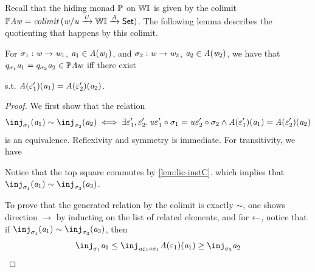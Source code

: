 Recall that the hiding monad ${\mathbb{P}}$ on $\mathbb{W}\mathbb{I}$ is given by the colimit ${\mathbb{P}}\mathit{A}\mathit{w} = \mathit{colimit}\,{({\mathit{w}}/{\mathit{u}} \xrightarrow{\mathit{U}} \mathbb{W}\mathbb{I} \xrightarrow{\mathit{A}} \mathsf{Set})}$.
The following lemma describes the quotienting that happens by this colimit.
\begin{lemma}\label{lem:hmon-quotient}
    For $\sigma_1 : \mathit{w} \to \mathit{w}_1$, $\mathit{a}_1 \in \mathit{A}(\mathit{w}_1)$, and $\sigma_2 : \mathit{w} \to \mathit{w}_2$, $\mathit{a}_2 \in \mathit{A}(\mathit{w}_2)$, 
    we have that $q_{\sigma_1}\mathit{a}_1 = q_{\sigma_2}\mathit{a}_2 \in {\mathbb{P}}\mathit{A}\mathit{w}$ iff there exist 
    s.t. $\mathit{A}(\varepsilon_1')(\mathit{a}_1) = \mathit{A}(\varepsilon_2')(\mathit{a}_2)$.
\end{lemma}
\begin{proof}
    We first show that the relation
    \[ \inj_{\sigma_1}(\va_1) \sim \inj_{\sigma_2}(\va_2) \iff 
       \ExistsTwo{\me_1'}{\me_2'} \instU\me_1' \comp \sigma_1 = \instU\me_2' \comp \sigma_2 \Land \vA(\me_1')(\va_1) = \vA(\me_2')(\va_2) \]
    is an equivalence.
    Reflexivity and symmetry is immediate.
    For transitivity, we have
    \begin{center}
    \end{center}
    Notice that the top square commutes by \cref{lem:lic-instC}.
    which implies that $\inj_{\sigma_1}(\va_1) \sim \inj_{\sigma_3}(\va_3)$.

    To prove that the generated relation by the colimit is exactly $\sim$, one shows direction $\to$ by inducting on the list of related elements,
    and for $\leftarrow$, notice that if $\inj_{\sigma_1}(\va_1) \sim \inj_{\sigma_3}(\va_3)$, then
    \[ \inj_{\sigma_1}\va_1 \leq \inj_{\instU\me_1 \comp \sigma_1}\vA(\me_1)(\va_1) \ge \inj_{\sigma_2}\va_2 \]

\end{proof}
